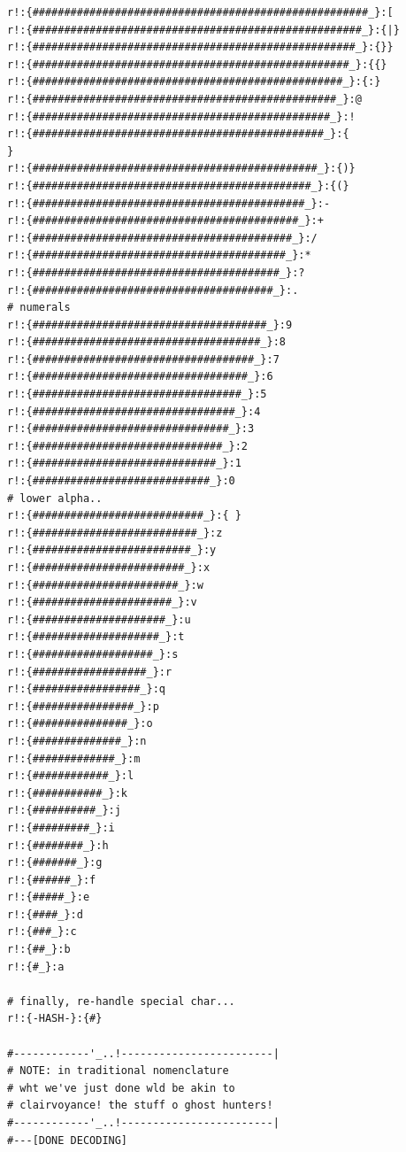 \documentclass[a4paper, 18pt]{book} %
\begin{document}
{{{{\begin{tcolorbox}[teaterminalstyle, title=TEA Program:  GHOST Messages Protocol v1.1, breakable]
\begin{lstlisting}[language=TEA,breaklines=true,]
r!:{#####################################################_}:[
r!:{####################################################_}:{|}
r!:{###################################################_}:{}}
r!:{##################################################_}:{{}
r!:{#################################################_}:{:}
r!:{################################################_}:@
r!:{###############################################_}:!
r!:{##############################################_}:{
}
r!:{#############################################_}:{)}
r!:{############################################_}:{(}
r!:{###########################################_}:-
r!:{##########################################_}:+
r!:{#########################################_}:/
r!:{########################################_}:*
r!:{#######################################_}:?
r!:{######################################_}:.
# numerals
r!:{#####################################_}:9
r!:{####################################_}:8
r!:{###################################_}:7
r!:{##################################_}:6
r!:{#################################_}:5
r!:{################################_}:4
r!:{###############################_}:3
r!:{##############################_}:2
r!:{#############################_}:1
r!:{############################_}:0
# lower alpha..
r!:{###########################_}:{ }
r!:{##########################_}:z
r!:{#########################_}:y
r!:{########################_}:x
r!:{#######################_}:w
r!:{######################_}:v
r!:{#####################_}:u
r!:{####################_}:t
r!:{###################_}:s
r!:{##################_}:r
r!:{#################_}:q
r!:{################_}:p
r!:{###############_}:o
r!:{##############_}:n
r!:{#############_}:m
r!:{############_}:l
r!:{###########_}:k
r!:{##########_}:j
r!:{#########_}:i
r!:{########_}:h
r!:{#######_}:g
r!:{######_}:f
r!:{#####_}:e
r!:{####_}:d
r!:{###_}:c
r!:{##_}:b
r!:{#_}:a

# finally, re-handle special char...
r!:{-HASH-}:{#}

#------------'_..!------------------------|
# NOTE: in traditional nomenclature
# wht we've just done wld be akin to
# clairvoyance! the stuff o ghost hunters!
#------------'_..!------------------------|
#---[DONE DECODING]
   \end{lstlisting}
  \end{tcolorbox}
  \caption{TEA APPLICATION: CRYPTOGRAPHY: GHOST Messages Protocol v1.1}
  \label{FIGR3}
}


\vspace{2em}

}}}
\end{document}
